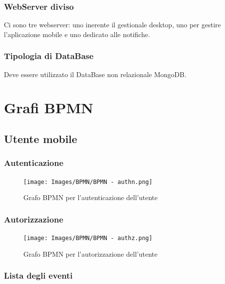 \documentclass{article}
\begin{document}
\subsubsection{WebServer diviso}
Ci sono tre webserver: uno inerente il gestionale desktop, uno per gestire l'aplicazione mobile e uno dedicato alle notifiche.

\subsubsection{Tipologia di DataBase}
Deve essere utilizzato il DataBase non relazionale MongoDB.

\clearpage

\section{Grafi BPMN}

\subsection{Utente mobile}

\subsubsection{Autenticazione}

\begin{figure}[htbp]
    \label{7.1.1}
    \centering
    \texttt{[image: Images/BPMN/BPMN - authn.png]}
    \caption{Grafo BPMN per l'autenticazione dell'utente}
\end{figure}

\clearpage

\subsubsection{Autorizzazione}

\begin{figure}[htbp]
    \label{7.1.2}
    \centering
    \texttt{[image: Images/BPMN/BPMN - authz.png]}
    \caption{Grafo BPMN per l'autorizzazione dell'utente}
\end{figure}

\clearpage

\subsubsection{Lista degli eventi}
\end{document}
